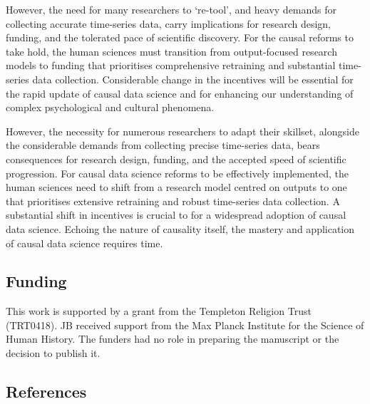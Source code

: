 \documentclass[
  singlecolumn,
  9pt]{article}
\begin{document}
However, the need for many researchers to `re-tool', and heavy demands
for collecting accurate time-series data, carry implications for
research design, funding, and the tolerated pace of scientific
discovery. For the causal reforms to take hold, the human sciences must
transition from output-focused research models to funding that
prioritises comprehensive retraining and substantial time-series data
collection. Considerable change in the incentives will be essential for
the rapid update of causal data science and for enhancing our
understanding of complex psychological and cultural phenomena.

However, the necessity for numerous researchers to adapt their skillset,
alongside the considerable demands from collecting precise time-series
data, bears consequences for research design, funding, and the accepted
speed of scientific progression. For causal data science reforms to be
effectively implemented, the human sciences need to shift from a
research model centred on outputs to one that prioritises extensive
retraining and robust time-series data collection. A substantial shift
in incentives is crucial to for a widespread adoption of causal data
science. Echoing the nature of causality itself, the mastery and
application of causal data science requires time.

\newpage{}

\subsection{Funding}\label{funding}

This work is supported by a grant from the Templeton Religion Trust
(TRT0418). JB received support from the Max Planck Institute for the
Science of Human History. The funders had no role in preparing the
manuscript or the decision to publish it.

\subsection{References}\label{references}
\end{document}
